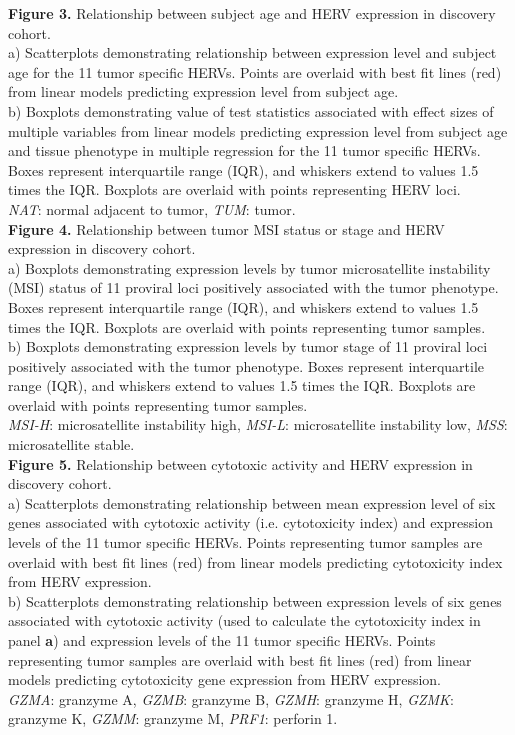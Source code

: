 \textbf{Figure 3.} Relationship between subject age and HERV expression in discovery cohort. \\
a) Scatterplots demonstrating relationship between expression level and subject age for the 11 tumor specific HERVs.
Points are overlaid with best fit lines (red) from linear models predicting expression level from subject age. \\
b) Boxplots demonstrating value of test statistics associated with effect sizes of multiple variables from linear models predicting expression level from subject age and tissue phenotype in multiple regression for the 11 tumor specific HERVs.
Boxes represent interquartile range (IQR), and whiskers extend to values 1.5 times the IQR.
Boxplots are overlaid with points representing HERV loci. \\
\emph{NAT}: normal adjacent to tumor, \emph{TUM}: tumor. \\

\textbf{Figure 4.} Relationship between tumor MSI status or stage and HERV expression in discovery cohort. \\
a) Boxplots demonstrating expression levels by tumor microsatellite instability (MSI) status of 11 proviral loci positively associated with the tumor phenotype.
Boxes represent interquartile range (IQR), and whiskers extend to values 1.5 times the IQR.
Boxplots are overlaid with points representing tumor samples. \\
b) Boxplots demonstrating expression levels by tumor stage of 11 proviral loci positively associated with the tumor phenotype.
Boxes represent interquartile range (IQR), and whiskers extend to values 1.5 times the IQR.
Boxplots are overlaid with points representing tumor samples. \\
\emph{MSI-H}: microsatellite instability high, \emph{MSI-L}: microsatellite instability low, \emph{MSS}: microsatellite stable. \\

\textbf{Figure 5.} Relationship between cytotoxic activity and HERV expression in discovery cohort. \\
a) Scatterplots demonstrating relationship between mean expression level of six genes associated with cytotoxic activity (i.e. cytotoxicity index) and expression levels of the 11 tumor specific HERVs.
Points representing tumor samples are overlaid with best fit lines (red) from linear models predicting cytotoxicity index from HERV expression. \\
b) Scatterplots demonstrating relationship between expression levels of six genes associated with cytotoxic activity (used to calculate the cytotoxicity index in panel \textbf{a}) and expression levels of the 11 tumor specific HERVs.
Points representing tumor samples are overlaid with best fit lines (red) from linear models predicting cytotoxicity gene expression from HERV expression. \\
\emph{GZMA}: granzyme A, \emph{GZMB}: granzyme B, \emph{GZMH}: granzyme H, \emph{GZMK}: granzyme K, \emph{GZMM}: granzyme M, \emph{PRF1}: perforin 1. \\


